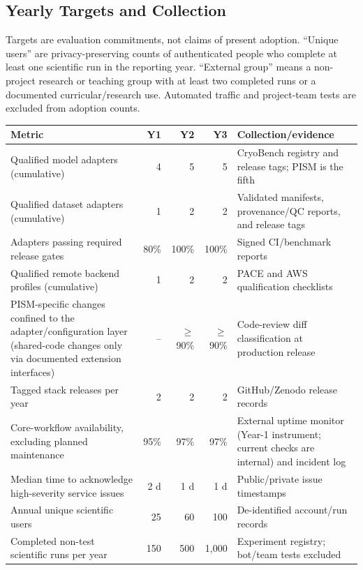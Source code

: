 \subsection*{Yearly Targets and Collection}

Targets are evaluation commitments, not claims of present adoption. ``Unique
users'' are privacy-preserving counts of authenticated people who complete at
least one scientific run in the reporting year. ``External group'' means a
non-project research or teaching group with at least two completed runs or a
documented curricular/research use. Automated traffic and project-team tests
are excluded from adoption counts.

\begin{table}[ht]
\centering
\scriptsize
\begin{tabular}{@{}p{}rrrp{}@{}}
\toprule
Metric & Y1 & Y2 & Y3 & Collection/evidence \\
\midrule
Qualified model adapters (cumulative) & 4 & 5 & 5 & CryoBench registry and release tags; PISM is the fifth \\
Qualified dataset adapters (cumulative) & 1 & 2 & 2 & Validated manifests, provenance/QC reports, and release tags \\
Adapters passing required release gates & 80\% & 100\% & 100\% & Signed CI/benchmark reports \\
Qualified remote backend profiles (cumulative) & 1 & 2 & 2 & PACE and AWS qualification checklists \\
PISM-specific changes confined to the adapter/configuration layer (shared-code changes only via documented extension interfaces) & -- & $\geq$90\% & $\geq$90\% & Code-review diff classification at production release \\
Tagged stack releases per year & 2 & 2 & 2 & GitHub/Zenodo release records \\
Core-workflow availability, excluding planned maintenance & 95\% & 97\% & 97\% & External uptime monitor (Year-1 instrument; current checks are internal) and incident log \\
Median time to acknowledge high-severity service issues & 2 d & 1 d & 1 d & Public/private issue timestamps \\
Annual unique scientific users & 25 & 60 & 100 & De-identified account/run records \\
Completed non-test scientific runs per year & 150 & 500 & 1,000 & Experiment registry; bot/team tests excluded \\

\end{tabular}
\end{table}
